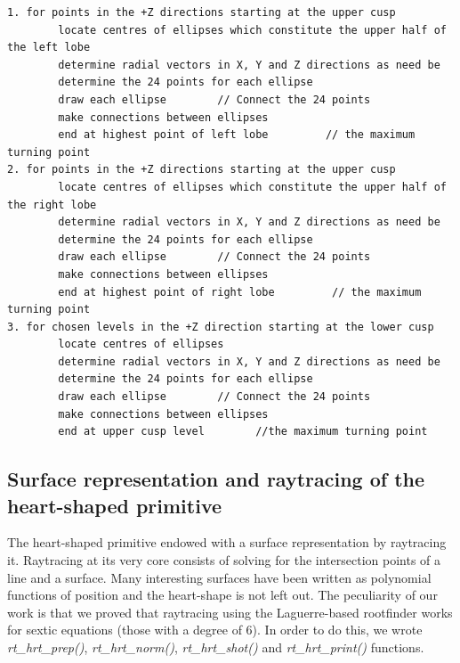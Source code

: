 \begin{verbatim}
1. for points in the +Z directions starting at the upper cusp 
        locate centres of ellipses which constitute the upper half of the left lobe 
        determine radial vectors in X, Y and Z directions as need be 
        determine the 24 points for each ellipse 
        draw each ellipse        // Connect the 24 points 
        make connections between ellipses 
        end at highest point of left lobe         // the maximum turning point 
2. for points in the +Z directions starting at the upper cusp 
        locate centres of ellipses which constitute the upper half of the right lobe 
        determine radial vectors in X, Y and Z directions as need be 
        determine the 24 points for each ellipse 
        draw each ellipse        // Connect the 24 points 
        make connections between ellipses 
        end at highest point of right lobe         // the maximum turning point   
3. for chosen levels in the +Z direction starting at the lower cusp 
        locate centres of ellipses 
        determine radial vectors in X, Y and Z directions as need be 
        determine the 24 points for each ellipse 
        draw each ellipse        // Connect the 24 points 
        make connections between ellipses
        end at upper cusp level        //the maximum turning point 
\end{verbatim}

\subsection{Surface   representation   and   raytracing   of   the   heart­-shaped primitive}

The   heart-­shaped   primitive   endowed   with   a   surface   representation   by  
raytracing   it.   Ray­tracing   at   its   very   core   consists   of   solving   for   the   intersection  
points   of   a   line   and   a   surface.   Many   interesting   surfaces   have   been   written   as  
polynomial   functions   of   position   and   the   heart­-shape   is   not   left   out.   The  
peculiarity   of   our   work   is   that   we   proved   that   ray­tracing   using   the  
Laguerre­-based   root­finder   works   for   sextic   equations   (those   with   a   degree   of  
6).   In   order   to   do   this,   we   wrote   \textit{rt\_hrt\_prep()},   \textit{rt\_hrt\_norm()},   \textit{rt\_hrt\_shot()}   and  
\textit{rt\_hrt\_print()} functions.


